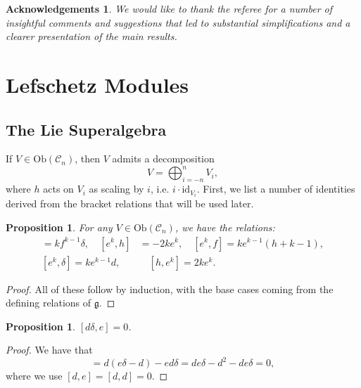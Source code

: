 \documentclass{amsart}
\newcommand{\id}{\text{id}}
\newtheorem{prop}[theorem]{Proposition}
\newtheorem*{Acknow}{Acknowledgements}
\theoremstyle{definition}
\begin{document}
\begin{Acknow}
   We would like to thank the referee for a number of insightful comments and suggestions that led to substantial simplifications and a clearer presentation of the main results.
\end{Acknow}
\section{Lefschetz Modules}
\subsection{The Lie Superalgebra}
 If $V \in \mathrm{Ob}(\mathscr{C}_{n})$, then $V$ admits a decomposition
    \begin{equation*}
        V = \bigoplus_{i=-n}^n V_i,
    \end{equation*}
 where $h$ acts on $V_i$ as scaling by $i$, i.e. $i\cdot \id_{V_i}$.
 First, we list a number of identities derived from the bracket relations that will be used later. 
\begin{prop} For any $V \in \mathrm{Ob}(\mathscr{C}_n)$, we have the relations:
\begin{align*}
    [f^k,d]=kf^{k-1}\delta, \quad [e^k,h]&=-2ke^k, \quad [e^k,f]=ke^{k-1}(h+k-1), \\
    [e^k,\delta]=ke^{k-1}d, \quad & \quad  [h,e^k] = 2ke^k.
\end{align*}
\end{prop}
\begin{proof}
    All of these follow by induction, with the base cases coming from the defining relations of $\mathfrak{g}$.
\end{proof}

\begin{prop}\label{ddeltaebracket0}
    $[d\delta,e]=0$.
\end{prop}
\begin{proof}
    We have that 
    \begin{equation*}
        [d\delta,e] = d(e\delta-d)-ed\delta = de\delta - d^2 -d e \delta =0,
    \end{equation*}
    where we use $[d,e]=[d,d]=0$.
\end{proof}
\end{document}
